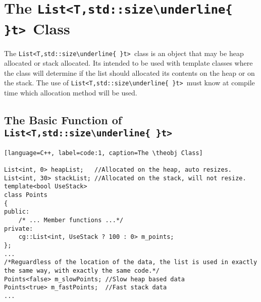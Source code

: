 \documentclass{article}
\newlength\tdima \newlength\tdimb \setlength\tdima{ \fboxsep+\fboxrule} \setlength\tdimb{-\fboxsep+\fboxrule}
\newcommand{\theobj}{\protect\Verb+List<T,std::size\underline{ }t> +}
\begin{document}
\tableofcontents




\captionsetup[lstlisting]{format=listing,labelfont=white,textfont=white}
\lstset{style=cppstyle}

\section{The \theobj Class}

The \theobj class is an object that may be heap allocated or stack allocated.  Its intended to be used with template classes where the class will determine if the list should allocated its contents on the heap or on the stack.  The use of \theobj must know at compile time which allocation method will be used.

\subsection{The Basic Function of \theobj}


\begin{lstlisting}[language=C++, label=code:1, caption=The \theobj Class]

List<int, 0> heapList;   //Allocated on the heap, auto resizes.
List<int, 30> stackList; //Allocated on the stack, will not resize.
template<bool UseStack>
class Points
{
public:
	/* ... Member functions ...*/
private:
	cg::List<int, UseStack ? 100 : 0> m_points;
};
...
/*Reguardless of the location of the data, the list is used in exactly the same way, with exactly the same code.*/
Points<false> m_slowPoints; //Slow heap based data
Points<true> m_fastPoints;  //Fast stack data
...
\end{lstlisting}
\end{document}
